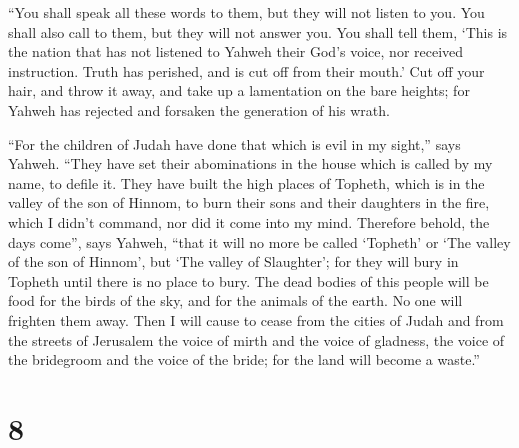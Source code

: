 ``You shall speak all these words to them, but they will
not listen to you. You shall also call to them, but they will not answer
you.  You shall tell them, `This is the nation that has not
listened to Yahweh their God's voice, nor received instruction. Truth
has perished, and is cut off from their mouth.'  Cut off
your hair, and throw it away, and take up a lamentation on the bare
heights; for Yahweh has rejected and forsaken the generation of his
wrath.

 ``For the children of Judah have done that which is evil
in my sight,'' says Yahweh. ``They have set their abominations in the
house which is called by my name, to defile it.  They have
built the high places of Topheth, which is in the valley of the son of
Hinnom, to burn their sons and their daughters in the fire, which I
didn't command, nor did it come into my mind.  Therefore
behold, the days come'', says Yahweh, ``that it will no more be called
`Topheth' or `The valley of the son of Hinnom', but `The valley of
Slaughter'; for they will bury in Topheth until there is no place to
bury.  The dead bodies of this people will be food for the
birds of the sky, and for the animals of the earth. No one will frighten
them away.  Then I will cause to cease from the cities of
Judah and from the streets of Jerusalem the voice of mirth and the voice
of gladness, the voice of the bridegroom and the voice of the bride; for
the land will become a waste.''

\hypertarget{section-7}{%
\section{8}\label{section-7}}

